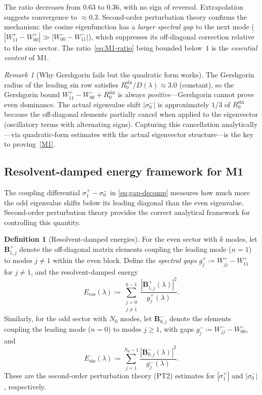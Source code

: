 \documentclass[12pt,a4paper]{article}
\theoremstyle{definition}
\newtheorem{definition}[theorem]{Definition}
\theoremstyle{remark}
\newtheorem{remark}[theorem]{Remark}
\begin{document}
\noindent The ratio decreases from $0.63$ to $0.36$, with no sign of reversal. Extrapolation suggests convergence to $\approx 0.3$. Second-order perturbation theory confirms the mechanism: the cosine eigenfunction has a \emph{larger spectral gap} to the next mode ($|W_{11}^+ - W_{00}^+| \gg |W_{00}^- - W_{11}^-|$), which suppresses its off-diagonal correction relative to the sine sector. The ratio~\eqref{eq:M1-ratio} being bounded below~$1$ is the \emph{essential content} of M1.

\begin{remark}[Why Gershgorin fails but the quadratic form works]
The Gershgorin radius of the leading sin row satisfies $R_0^{\sin}/D(\lambda) \approx 3.0$ (constant), so the Gershgorin bound $W_{11}^+ - W_{00}^- + R_0^{\sin}$ is always \emph{positive}---Gershgorin cannot prove even dominance. The actual eigenvalue shift $|\sigma_0^-|$ is approximately $1/3$ of $R_0^{\sin}$ because the off-diagonal elements partially cancel when applied to the eigenvector (oscillatory terms with alternating signs). Capturing this cancellation analytically---via quadratic-form estimates with the actual eigenvector structure---is the key to proving~\ref{M1}.
\end{remark}


\subsection{Resolvent-damped energy framework for M1}
\label{sec:resolvent-M1}

The coupling differential $\sigma_1^+ - \sigma_0^-$ in \eqref{eq:gap-decomp} measures how much more the odd eigenvalue shifts below its leading diagonal than the even eigenvalue. Second-order perturbation theory provides the correct analytical framework for controlling this quantity.

\begin{definition}[Resolvent-damped energies]
\label{def:resolvent-energies}
For the even sector with $k$ modes, let $\mathbf{B}^+_{1,j}$ denote the off-diagonal matrix elements coupling the leading mode ($n=1$) to modes $j \neq 1$ within the even block. Define the \emph{spectral gaps} $g_j^+ \coloneqq W_{jj}^+ - W_{11}^+$ for $j \neq 1$, and the resolvent-damped energy
\[
  E_{\cos}(\lambda) \coloneqq \sum_{\substack{j=0 \\ j \neq 1}}^{k-1} \frac{|\mathbf{B}^+_{1,j}(\lambda)|^2}{g_j^+(\lambda)}.
\]
Similarly, for the odd sector with $N_0$ modes, let $\mathbf{B}^-_{0,j}$ denote the elements coupling the leading mode ($n=0$) to modes $j \geq 1$, with gaps $g_j^- \coloneqq W_{jj}^- - W_{00}^-$, and
\[
  E_{\sin}(\lambda) \coloneqq \sum_{j=1}^{N_0-1} \frac{|\mathbf{B}^-_{0,j}(\lambda)|^2}{g_j^-(\lambda)}.
\]
These are the second-order perturbation theory (PT2) estimates for $|\sigma_1^+|$ and $|\sigma_0^-|$, respectively.
\end{definition}
\end{document}
